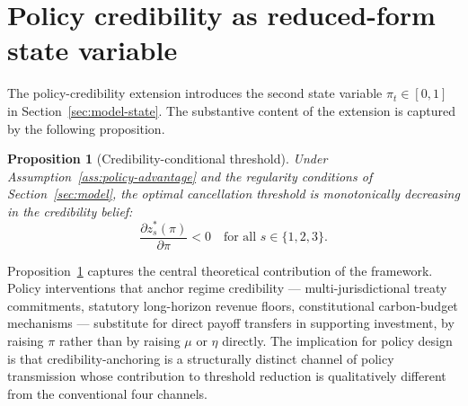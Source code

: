 \documentclass[12pt,a4paper]{article}
\theoremstyle{plain}
\newtheorem{proposition}{Proposition}
\theoremstyle{definition}
\begin{document}
\section{Policy credibility as reduced-form state variable}
\label{sec:policy-credibility}

The policy-credibility extension introduces the second state variable $\pi_t \in [0, 1]$ in Section~\ref{sec:model-state}. The substantive content of the extension is captured by the following proposition.

\begin{proposition}[Credibility-conditional threshold]
\label{prop:credibility-threshold}
Under Assumption~\ref{ass:policy-advantage} and the regularity conditions of Section~\ref{sec:model}, the optimal cancellation threshold is monotonically decreasing in the credibility belief:
\[
\frac{\partial z^{*}_{s}(\pi)}{\partial \pi} < 0 \quad \text{for all } s \in \{1, 2, 3\}.
\]
\end{proposition}
\noindent Proposition~\ref{prop:credibility-threshold} captures the central theoretical contribution of the framework. Policy interventions that anchor regime credibility --- multi-jurisdictional treaty commitments, statutory long-horizon revenue floors, constitutional carbon-budget mechanisms --- substitute for direct payoff transfers in supporting investment, by raising $\pi$ rather than by raising $\mu$ or $\eta$ directly. The implication for policy design is that credibility-anchoring is a structurally distinct channel of policy transmission whose contribution to threshold reduction is qualitatively different from the conventional four channels.
\end{document}

